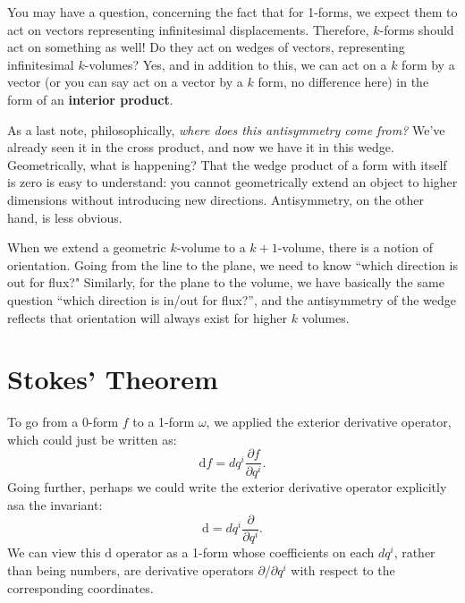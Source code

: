 \documentclass[../master.tex]{subfiles}
\begin{document}
	You may have a question, concerning the fact that for 1-forms, we expect them to act on vectors representing infinitesimal displacements. Therefore, $k$-forms should act on something as well! Do they act on wedges of vectors, representing infinitesimal $k$-volumes? Yes, and in addition to this, we can act on a $k$ form by a vector (or you can say act on a vector by a $k$ form, no difference here) in the form of an \textbf{interior product}. 
	
	
	As a last note, philosophically, \emph{where does this antisymmetry come from?} We've already seen it in the cross product, and now we have it in this wedge. Geometrically, what is happening? That the wedge product of a form with itself is zero is easy to understand: you cannot geometrically extend an object to higher dimensions without introducing new directions. Antisymmetry, on the other hand, is less obvious.
	
	 When we extend a geometric $k$-volume to a $k+1$-volume, there is a notion of orientation. Going from the line to the plane, we need to know ``which direction is out for flux?" Similarly, for the plane to the volume, we have basically the same question ``which direction is in/out for flux?'', and the antisymmetry of the wedge reflects that orientation will always exist for higher $k$ volumes.
	
	
	\section{Stokes' Theorem} %
	\label{sec:stokes_theorem}
	
	
	To go from a 0-form $f$ to a 1-form $\omega$, we applied the exterior derivative operator, which could just be written as:
	\begin{equation}
		\mathrm df = dq^i \frac{\partial f}{\partial q^i}.
	\end{equation}
	Going further, perhaps we could write the exterior derivative operator explicitly asa the invariant: 
	\begin{equation}\label{eq:exterior_derivative}
		\mathrm d = dq^i \frac{\partial}{\partial q^i}.
	\end{equation}
	We can view this $\mathrm d$ operator as a 1-form whose coefficients on each $dq^i$, rather than being numbers, are derivative operators $\partial/\partial q^i$ with respect to the corresponding coordinates. 
	
\end{document}
